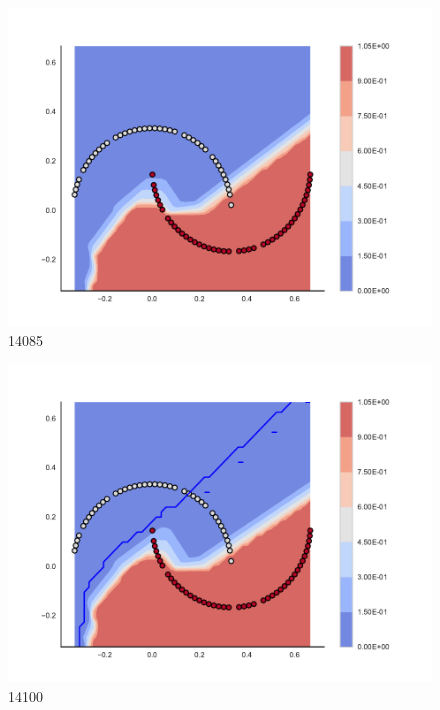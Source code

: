 \begin{subfigure}[b]{0.09\textwidth}
    \includegraphics[clip, trim=2.35cm 1.75cm 4.5cm 0cm,width=\textwidth]{img/convergence/14085.pdf}
    \caption{14085}
    \label{fig:convergence_14085}
\end{subfigure}
%
\begin{subfigure}[b]{0.09\textwidth}
    \includegraphics[clip, trim=2.35cm 1.75cm 4.5cm 0cm,width=\textwidth]{img/convergence/14100.pdf}
    \caption{14100}
    \label{fig:convergence_14100}
\end{subfigure}
%
